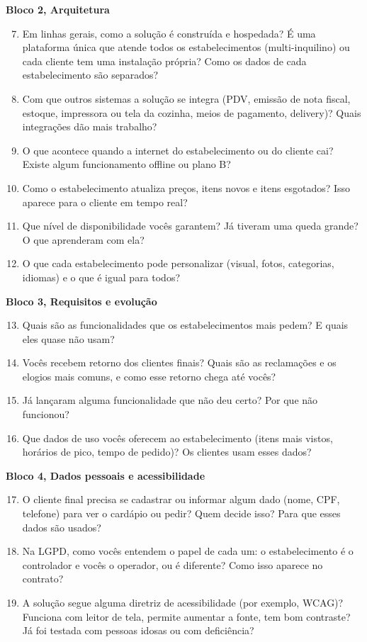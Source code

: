 \noindent\textbf{Bloco 2, Arquitetura}
\begin{enumerate}\setcounter{enumi}{6}
	\item Em linhas gerais, como a solução é construída e hospedada? É uma plataforma única que atende todos os estabelecimentos (multi-inquilino) ou cada cliente tem uma instalação própria? Como os dados de cada estabelecimento são separados?
	\item Com que outros sistemas a solução se integra (PDV, emissão de nota fiscal, estoque, impressora ou tela da cozinha, meios de pagamento, delivery)? Quais integrações dão mais trabalho?
	\item O que acontece quando a internet do estabelecimento ou do cliente cai? Existe algum funcionamento offline ou plano B?
	\item Como o estabelecimento atualiza preços, itens novos e itens esgotados? Isso aparece para o cliente em tempo real?
	\item Que nível de disponibilidade vocês garantem? Já tiveram uma queda grande? O que aprenderam com ela?
	\item O que cada estabelecimento pode personalizar (visual, fotos, categorias, idiomas) e o que é igual para todos?
\end{enumerate}

\noindent\textbf{Bloco 3, Requisitos e evolução}
\begin{enumerate}\setcounter{enumi}{12}
	\item Quais são as funcionalidades que os estabelecimentos mais pedem? E quais eles quase não usam?
	\item Vocês recebem retorno dos clientes finais? Quais são as reclamações e os elogios mais comuns, e como esse retorno chega até vocês?
	\item Já lançaram alguma funcionalidade que não deu certo? Por que não funcionou?
	\item Que dados de uso vocês oferecem ao estabelecimento (itens mais vistos, horários de pico, tempo de pedido)? Os clientes usam esses dados?
\end{enumerate}

\noindent\textbf{Bloco 4, Dados pessoais e acessibilidade}
\begin{enumerate}\setcounter{enumi}{16}
	\item O cliente final precisa se cadastrar ou informar algum dado (nome, CPF, telefone) para ver o cardápio ou pedir? Quem decide isso? Para que esses dados são usados?
	\item Na LGPD, como vocês entendem o papel de cada um: o estabelecimento é o controlador e vocês o operador, ou é diferente? Como isso aparece no contrato?
	\item A solução segue alguma diretriz de acessibilidade (por exemplo, WCAG)? Funciona com leitor de tela, permite aumentar a fonte, tem bom contraste? Já foi testada com pessoas idosas ou com deficiência?
\end{enumerate}

